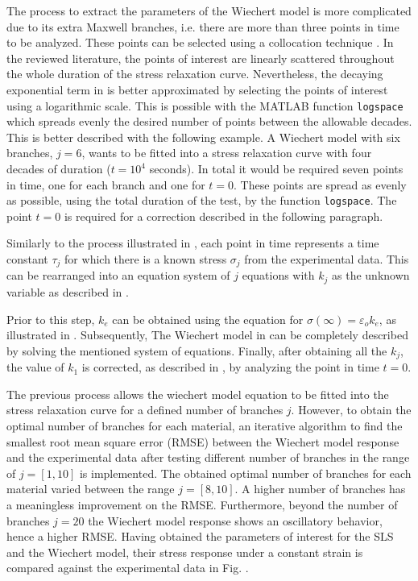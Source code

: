 The process to extract the parameters of the Wiechert model is more complicated due to its extra Maxwell branches, i.e. there are more than three points in time to be analyzed. These points can be selected using a collocation technique \cite{roylance2001engineering,machiraju2006viscoelastic}. In the reviewed literature, the points of interest are linearly scattered throughout the whole duration of the stress relaxation curve. Nevertheless, the decaying exponential term in  is better approximated by selecting the points of interest using a logarithmic scale. This is possible with the MATLAB function \texttt{logspace} which spreads evenly the desired number of points between the allowable decades. 
This is better described with the following example. A Wiechert model with six branches, $j=6$, wants to be fitted into a stress relaxation curve with four decades of duration ($t=10^4$ seconds). In total it would be required seven points in time, one for each branch and one for $t=0$. These points are spread as evenly as possible, using the total duration of the test, by the function \texttt{logspace}. The point $t=0$ is required for a correction described in the following paragraph. 

Similarly to the process illustrated in , each point in time represents a time constant $\tau_j$ for which there is a known stress $\sigma_j$ from the experimental data. This can be rearranged into an equation system of $j$ equations with $k_j$ as the unknown variable as described in \cite{machiraju2006viscoelastic}. 


Prior to this step, $k_e$ can be obtained using the equation for $\sigma(\infty)=\varepsilon_o k_e$, as illustrated in . Subsequently, The Wiechert model in  can be completely described by solving the mentioned system of equations. Finally, after obtaining all the $k_j$, the value of $k_1$ is corrected, as described in \cite{roylance2001engineering}, by analyzing the point in time $t=0$.

The previous process allows the wiechert model equation to be fitted into the stress relaxation curve for a defined number of branches $j$. However, to obtain the optimal number of branches for each material, an iterative algorithm to find the smallest root mean square error (RMSE) between the Wiechert model response and the experimental data after testing different number of branches in the range of $j=[1,10]$ is implemented. The obtained optimal number of branches for each material varied between the range $j=[8,10]$. A higher number of branches has a meaningless improvement on the RMSE. Furthermore, beyond the number of branches $j=20$ the Wiechert model response shows an oscillatory behavior, hence a higher RMSE. Having obtained the parameters of interest for the SLS and the Wiechert model, their stress response under a constant strain is compared against the experimental data in Fig. . 

